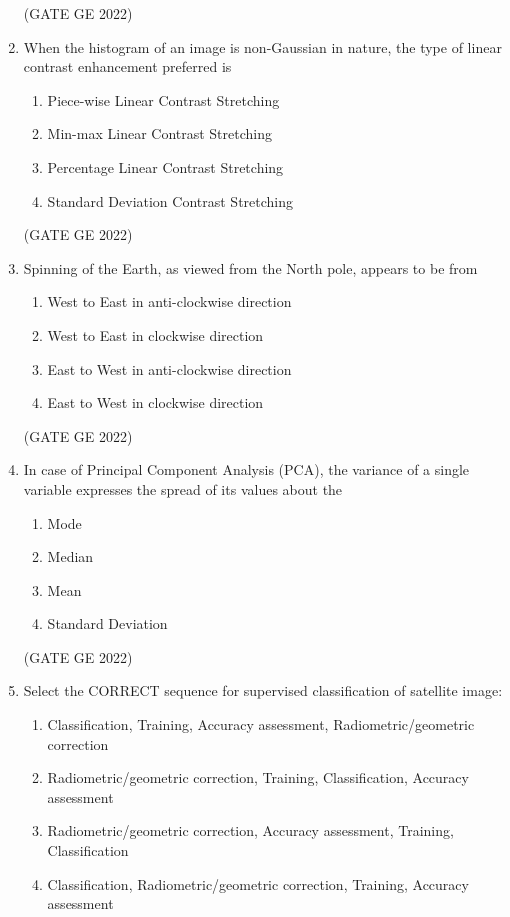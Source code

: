 \documentclass[a4paper, 11pt]{article}
\begin{document}
\begin{enumerate}
\hfill (GATE GE 2022)

\item When the histogram of an image is non-Gaussian in nature, the type of linear contrast enhancement preferred is
\begin{enumerate}
    \item Piece-wise Linear Contrast Stretching
    \item Min-max Linear Contrast Stretching
    \item Percentage Linear Contrast Stretching
    \item Standard Deviation Contrast Stretching
\end{enumerate}

\hfill (GATE GE 2022)

\item Spinning of the Earth, as viewed from the North pole, appears to be from
\begin{enumerate}
    \item West to East in anti-clockwise direction
    \item West to East in clockwise direction
    \item East to West in anti-clockwise direction
    \item East to West in clockwise direction
\end{enumerate}

\hfill (GATE GE 2022)

\item In case of Principal Component Analysis (PCA), the variance of a single variable expresses the spread of its values about the
\begin{enumerate}
    \item Mode
    \item Median
    \item Mean
    \item Standard Deviation
\end{enumerate}

\hfill (GATE GE 2022)

\item Select the CORRECT sequence for supervised classification of satellite image:
\begin{enumerate}
    \item Classification, Training, Accuracy assessment, Radiometric/geometric correction
    \item Radiometric/geometric correction, Training, Classification, Accuracy assessment
    \item Radiometric/geometric correction, Accuracy assessment, Training, Classification
    \item Classification, Radiometric/geometric correction, Training, Accuracy assessment
\end{enumerate}


\end{enumerate}
\end{document}
